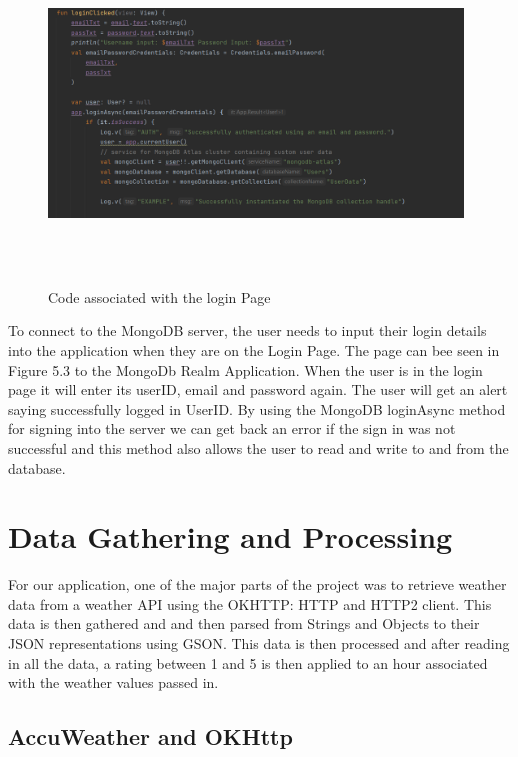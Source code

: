 \begin{figure}[H]
    \centering
    \includegraphics[width=11cm, height = 9cm]{img/mongoSignIn.PNG}
    \caption{Code associated with the login Page}
    \label{fig:altas config}
\end{figure}
To connect to the MongoDB server, the user needs to input their login details into the application when they are on the Login Page. The page can bee seen in Figure 5.3 to the MongoDb Realm Application. When the user is in the login page it will enter its userID, email and password again. The user will get an alert saying successfully logged in UserID. \newline
By using the MongoDB loginAsync method for signing into the server we can get back an error if the sign in was not successful and this method also allows the user to read and write to and from the database.

\section{Data Gathering and Processing}
For our application, one of the major parts of the project was to retrieve weather data from a weather API using the OKHTTP: HTTP and HTTP2 client. This data is then gathered and and then parsed from Strings and Objects to their JSON representations using GSON. This data is then processed and after reading in all the data, a rating between 1 and 5 is then applied to an hour associated with the weather values passed in.


\subsection{AccuWeather and OKHttp}
